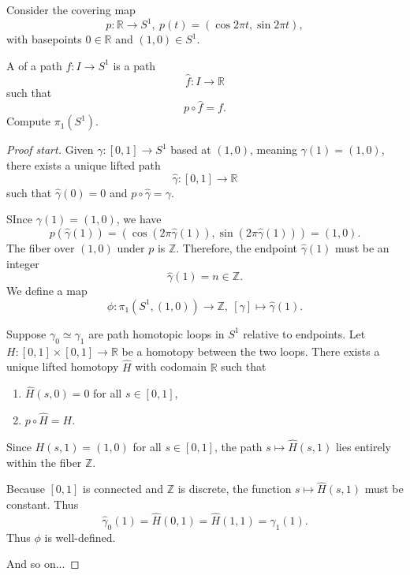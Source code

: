 \documentclass[11pt]{article}
\begin{document}
\begin{prob}
    Consider the covering map 
    \[
        p : \mathbb R \to S^1, \ p(t) 
        = (\cos 2\pi t, \sin 2\pi t), 
    \]
    with basepoints $0 \in \mathbb R$ and 
    $(1,0) \in S^1$. 

    A  of a path 
    $f : I \to S^1$ is a path 
    \[
        \widehat f : I \to \mathbb R 
    \]
    such that 
    \[
        p \circ \widehat f = f. 
    \]
    Compute $\pi_1(S^1)$. 
\end{prob}
\begin{proof}[Proof start]
    Given $\gamma : [0,1] \to S^1$ based 
    at $(1,0)$, meaning $\gamma(1) = (1,0)$, 
    there exists a unique lifted path 
    \[
        \hat \gamma : [0,1] \to \mathbb R
    \]
    such that $\hat \gamma(0) = 0$ and 
    $p \circ \hat \gamma = \gamma$. 

    SInce $\gamma(1) = (1,0)$, we have 
    \[
        p(\hat \gamma(1)) 
        = (\cos(2\pi \hat \gamma(1)), 
        \sin(2\pi\hat\gamma(1))) 
        = (1,0). 
    \]
    The fiber over $(1,0)$ under $p$ is 
    $\mathbb Z$. Therefore, the endpoint $\hat \gamma(1)$ 
    must be an integer 
    \[
        \hat \gamma (1) = n \in \mathbb Z. 
    \]
    We define a map 
    \[
        \phi : \pi_1(S^1, (1,0))
        \to \mathbb Z, \ [\gamma] 
        \mapsto \hat \gamma(1). 
    \]

    Suppose $\gamma_0 \simeq \gamma_1$ are 
    path homotopic loops in $S^1$ relative to 
    endpoints. Let $H : [0,1] \times [0,1] 
    \to \mathbb R$ be a homotopy between 
    the two loops. 
    There exists a unique lifted homotopy $\hat H$ with 
    codomain $\mathbb R$ such that 
    \begin{enumerate}
        \item $\widehat H(s,0) = 0$ for all $s \in [0,1]$, 
        \item $p \circ \widehat H = H$.
    \end{enumerate}
    Since $H(s,1) = (1,0)$ for all $s \in [0,1]$, 
    the path $s \mapsto \hat H(s,1)$ lies entirely 
    within the fiber $\mathbb Z$. 

    Because $[0,1]$ is connected and 
    $\mathbb Z$ is discrete, the function 
    $s \mapsto \hat H(s,1)$ must be constant. 
    Thus 
    \[
        \hat \gamma_0(1) = \hat H(0,1) 
        = \hat H(1,1) = \hat \gamma_1(1).
    \]
    Thus $\phi$ is well-defined. 

    And so on...
\end{proof}
\end{document}
